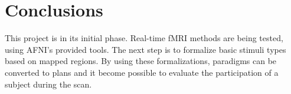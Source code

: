\documentclass[twocolumn]{bmcart}%
\begin{document}
\section{Conclusions}\label{conclusions}

This project is in its initial phase. Real-time fMRI methods are being
tested, using AFNI's provided tools. The next step is to formalize basic
stimuli types based on mapped regions. By using these formalizations,
paradigms can be converted to plans and it become possible to evaluate
the participation of a subject during the scan.

\end{document}
